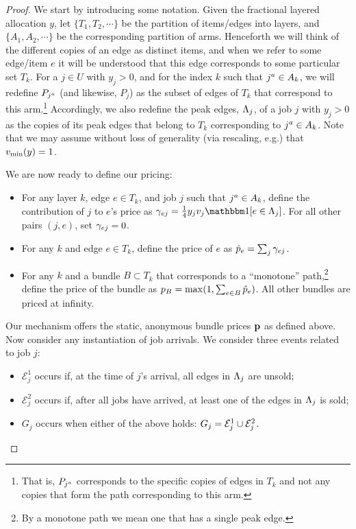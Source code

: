 \begin{proof}
We start by introducing some notation. Given the fractional layered
allocation $y$, let $\{T_1, T_2, \cdots\}$ be the partition of
items/edges into layers, and $\{A_1, A_2, \cdots\}$ be the
corresponding partition of arms. Henceforth we will think of the
different copies of an edge as distinct items, and when we refer to
some edge/item $e$ it will be understood that this edge corresponds to
some particular set $T_k$. For a $j\in U$ with $y_j>0$, and for the
index $k$ such that ${{j}^a}\in A_k$, we will redefine $P_{{{j}^a}}$ (and
likewise, $P_j$) as the subset of edges of $T_k$ that correspond to
this arm.\footnote{That is, $P_{{{j}^a}}$ corresponds to the specific
  copies of edges in $T_k$ and not any copies that form the path
  corresponding to this arm.} Accordingly, we also redefine the peak
edges, ${\Lambda_{j}}$, of a job $j$ with $y_j>0$ as the copies of its peak
edges that belong to $T_k$ corresponding to ${{j}^a}\in A_k$. Note that
we may assume without loss of generality (via rescaling, e.g.) that
$v_{\min}(y)=1$.

We are now ready to define our pricing:
\begin{itemize}
\item For any layer $k$, edge $e\in T_k$, and job $j$ such that
  ${{j}^a}\in A_k$, define the contribution of $j$ to $e$'s price as
  $\contrib_{ej} = \frac 14 y_j v_j \ind[e \in \peakj]$. For all other
  pairs $(j, e)$, set $\gamma_{ej} = 0$.
\item For any $k$ and edge $e\in T_k$, define the price of $e$
  as $\hat{p}_e = \sum_j \gamma_{ej}$.
\item For any $k$ and a bundle $B\subset T_k$ that corresponds to a
  ``monotone'' path,\footnote{By a monotone path we mean one that has
    a single peak edge.} define the price of the bundle as
  $p_B = \max(1, \sum_{e\in B} \hat{p}_e)$. All other bundles are priced at
  infinity.
\end{itemize}

\noindent
Our mechanism offers the static, anonymous bundle prices $\mathbf{p}$ as
defined above. Now consider any instantiation of job arrivals. We
consider three events related to job $j$:
\begin{itemize}
\item $\mathcal E^1_j$ occurs if, at the time of $j$'s arrival, all edges in
  ${\Lambda_{j}}$ are unsold;
\item $\mathcal E^2_j$ occurs if, after all jobs have arrived, at least one of
  the edges in ${\Lambda_{j}}$ is sold;
\item $G_j$ occurs when either of the above holds: $G_j = {\mathcal
    E}^1_j \cup {\mathcal E}^2_j$.
\end{itemize}


\end{proof}
